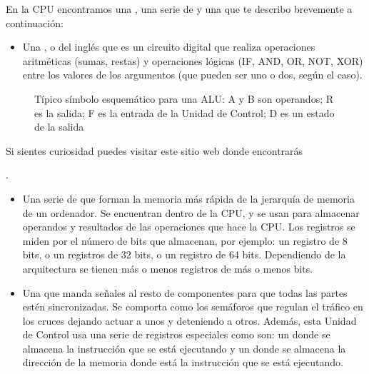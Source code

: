 \documentclass[letterpaper,10pt,spanish]{sphinxmanual}
\begin{document}
\sphinxAtStartPar
En la CPU encontramos una , una serie de  y una  que te describo brevemente a continuación:
\begin{itemize}
\item {} 
\sphinxAtStartPar
Una , o  del inglés  que es un circuito digital que realiza operaciones aritméticas (sumas, restas) y operaciones lógicas (IF, AND, OR, NOT, XOR) entre los valores de los argumentos (que pueden ser uno o dos, según el caso).

\end{itemize}

\begin{figure}[htbp]
\centering
\capstart

\noindent{}
\caption{Típico símbolo esquemático para una ALU: A y B son operandos; R es la salida; F es la entrada de la Unidad de Control; D es un estado de la salida}\label{\detokenize{software_hardware:id2}}\end{figure}


\nopagebreak


\sphinxAtStartPar
Si sientes curiosidad puedes visitar este sitio web donde encontrarás %
\begin{footnote}[1]\sphinxAtStartFootnote
{}
%
\end{footnote}.


\begin{itemize}
\item {} 
\sphinxAtStartPar
Una serie de  que forman la memoria más rápida de la jerarquía de memoria de un ordenador. Se encuentran dentro de la CPU, y se usan para almacenar operandos y resultados de las operaciones que hace la CPU. Los registros se miden por el número de bits que almacenan, por ejemplo: un registro de 8 bits, o un registros de 32 bits, o un registro de 64 bits. Dependiendo de la arquitectura se tienen más o menos registros de más o menos bits.

\item {} 
\sphinxAtStartPar
Una  que manda señales al resto de componentes para que todas las partes estén sincronizadas. Se comporta como los semáforos que regulan el tráfico en los cruces dejando actuar a unos y deteniendo a otros. Además, esta Unidad de Control usa una serie de registros especiales como son: un  donde se almacena la instrucción que se está ejecutando y un  donde se almacena la dirección de la memoria donde está la instrucción que se está ejecutando.

\end{itemize}
\end{document}
